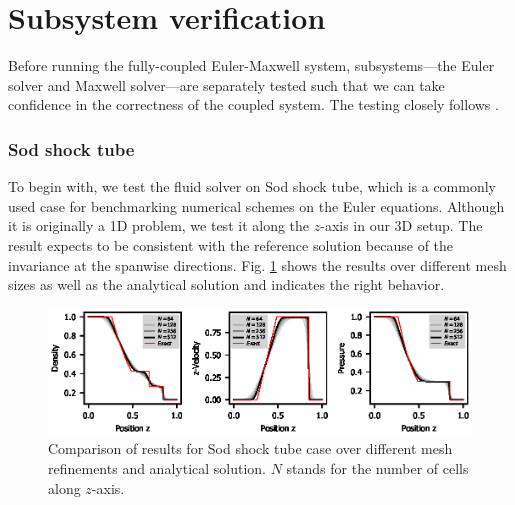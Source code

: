 \documentclass{report}
\begin{document}
\section{Subsystem verification}
Before running the fully-coupled Euler-Maxwell system, subsystems---the Euler solver and Maxwell solver---are separately tested such that we can take confidence in the correctness of the coupled system. The testing closely follows \cite{fuchs_2021}.

\subsubsection{Sod shock tube}
To begin with, we test the fluid solver on Sod shock tube, which is a commonly used case for benchmarking numerical schemes on the Euler equations. Although it is originally a 1D problem, we test it along the $z$-axis in our 3D setup. The result expects to be consistent with the reference solution because of the invariance at the spanwise directions. Fig. \ref{fig:sod_test} shows the results over different mesh sizes as well as the analytical solution \citep{isaac_2017} and indicates the right behavior. 
\begin{figure}
    \centering
    \includegraphics{sod_test.eps}
    \caption{Comparison of results for Sod shock tube case over different mesh refinements and analytical solution. $N$ stands for the number of cells along $z$-axis.}
    \label{fig:sod_test}
\end{figure}
\end{document}
